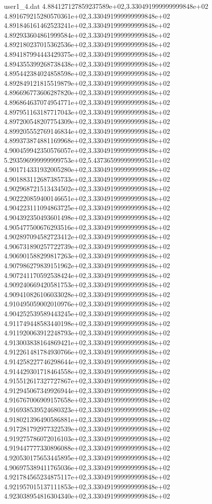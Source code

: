 \begin{filecontents}{user1_4.dat}
4.884127127859237589e+02,3.330491999999999848e+02
4.891679215280570361e+02,3.330491999999999848e+02
4.891846161462523241e+02,3.330491999999999848e+02
4.892933604861999584e+02,3.330491999999999848e+02
4.892180237015362536e+02,3.330491999999999848e+02
4.894187994443429375e+02,3.330491999999999848e+02
4.894355399268738438e+02,3.330491999999999848e+02
4.895442384024858598e+02,3.330491999999999848e+02
4.892849121815519879e+02,3.330491999999999848e+02
4.896696773606287820e+02,3.330491999999999848e+02
4.896864637074954771e+02,3.330491999999999848e+02
4.897951163187717043e+02,3.330491999999999848e+02
4.897200548207754309e+02,3.330491999999999848e+02
4.899205552769146834e+02,3.330491999999999848e+02
4.899373874881169968e+02,3.330491999999999848e+02
4.900459942350576057e+02,3.330491999999999848e+02
5.293596999999999753e+02,5.437365999999999531e+02
4.901714331932005280e+02,3.330491999999999848e+02
4.901883112687385733e+02,3.330491999999999848e+02
4.902968721513434502e+02,3.330491999999999848e+02
4.902220859400146651e+02,3.330491999999999848e+02
4.904223111094863725e+02,3.330491999999999848e+02
4.904392350493601498e+02,3.330491999999999848e+02
4.905477500676293516e+02,3.330491999999999848e+02
4.902897094582723412e+02,3.330491999999999848e+02
4.906731890257722739e+02,3.330491999999999848e+02
4.906901588299817263e+02,3.330491999999999848e+02
4.907986279839151962e+02,3.330491999999999848e+02
4.907241170592538424e+02,3.330491999999999848e+02
4.909240669420581753e+02,3.330491999999999848e+02
4.909410826106033028e+02,3.330491999999999848e+02
4.910495059002010976e+02,3.330491999999999848e+02
4.904252539589443245e+02,3.330491999999999848e+02
4.911749448583440198e+02,3.330491999999999848e+02
4.911920063912248793e+02,3.330491999999999848e+02
4.913003838164869421e+02,3.330491999999999848e+02
4.912261481784930766e+02,3.330491999999999848e+02
4.914258227746298644e+02,3.330491999999999848e+02
4.914429301718464558e+02,3.330491999999999848e+02
4.915512617327727867e+02,3.330491999999999848e+02
4.912945067349926944e+02,3.330491999999999848e+02
4.916767006909157658e+02,3.330491999999999848e+02
4.916938539524680323e+02,3.330491999999999848e+02
4.918021396490586881e+02,3.330491999999999848e+02
4.917281792977322539e+02,3.330491999999999848e+02
4.919275786072016103e+02,3.330491999999999848e+02
4.919447777330896088e+02,3.330491999999999848e+02
4.920530175653445895e+02,3.330491999999999848e+02
4.906975389411765036e+02,3.330491999999999848e+02
4.921784565234875117e+02,3.330491999999999848e+02
4.921957015137111853e+02,3.330491999999999848e+02
4.923038954816304340e+02,3.330491999999999848e+02

\end{filecontents}

